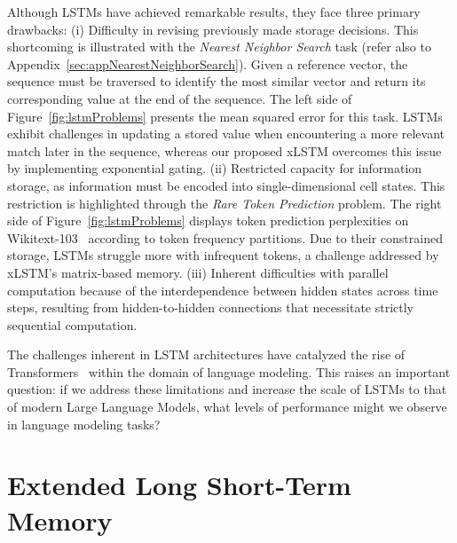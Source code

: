 Although LSTMs have achieved remarkable results, they face three primary drawbacks: (i) Difficulty in revising previously made storage decisions. This shortcoming is illustrated with the {\it Nearest Neighbor Search} task (refer also to Appendix~\ref{sec:appNearestNeighborSearch}). Given a reference vector, the sequence must be traversed to identify the most similar vector and return its corresponding value at the end of the sequence. The left side of Figure~\ref{fig:lstmProblems} presents the mean squared error for this task. LSTMs exhibit challenges in updating a stored value when encountering a more relevant match later in the sequence, whereas our proposed xLSTM overcomes this issue by implementing exponential gating. (ii) Restricted capacity for information storage, as information must be encoded into single-dimensional cell states. This restriction is highlighted through the {\it Rare Token Prediction} problem. The right side of Figure~\ref{fig:lstmProblems} displays token prediction perplexities on Wikitext-103~\citep{Merity:17} according to token frequency partitions. Due to their constrained storage, LSTMs struggle more with infrequent tokens, a challenge addressed by xLSTM’s matrix-based memory. (iii) Inherent difficulties with parallel computation because of the interdependence between hidden states across time steps, resulting from hidden-to-hidden connections that necessitate strictly sequential computation.

The challenges inherent in LSTM architectures have catalyzed the rise of Transformers~\citep{Vaswani:17} within the domain of language modeling. This raises an important question: if we address these limitations and increase the scale of LSTMs to that of modern Large Language Models, what levels of performance might we observe in language modeling tasks?

\section{Extended Long Short-Term Memory}
\label{sec:xLSTM}

